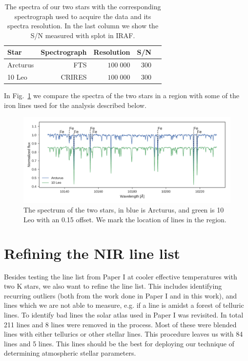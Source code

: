 \documentclass{aa}
\begin{document}
\begin{table}[htb!]
    \caption{The spectra of our two stars with the corresponding spectrograph
             used to acquire the data and its spectra resolution. In the last
             column we show the S/N measured with splot in IRAF.}
    \label{tab:data}
    \centering
    \begin{tabular}{lrrrr}
      \hline\hline
        Star      &  Spectrograph  & Resolution   &  S/N  \\
      \hline
        Arcturus  &  FTS           &  $100\;000$  &  300  \\
        10 Leo    &  CRIRES        &  $100\;000$  &  300
    \end{tabular}
\end{table}


In Fig.~\ref{fig:both} we compare the spectra of the two stars in a region with
some of the iron lines used for the analysis described below.

\begin{figure}[htpb!]
    \centering
    \includegraphics[width=1.0\linewidth]{figures/bothspectra.pdf}
    \caption{The spectrum of the two stars, in blue is Arcturus, and green is
             10 Leo with an 0.15 offset. We mark the location of 
             lines in the region.}
    \label{fig:both}
\end{figure}





\section{Refining the NIR line list}
\label{sec:refining_the_line_list}

Besides testing the line list from Paper I at cooler effective temperatures with
two K stars, we also want to refine the line list. This includes identifying
recurring outliers (both from the work done in Paper I and in this work), and
lines which we are not able to measure, e.g. if a line is amidst a forest of
telluric lines. To identify bad lines the solar atlas used in Paper I was
revisited. In total 211  lines and 8  lines were removed
in the process. Most of these were blended lines with either tellurics or other
stellar lines. This procedure leaves us with 84  lines and 5
 lines. This lines should be the best for deploying our technique of
determining atmospheric stellar parameters.
\end{document}
